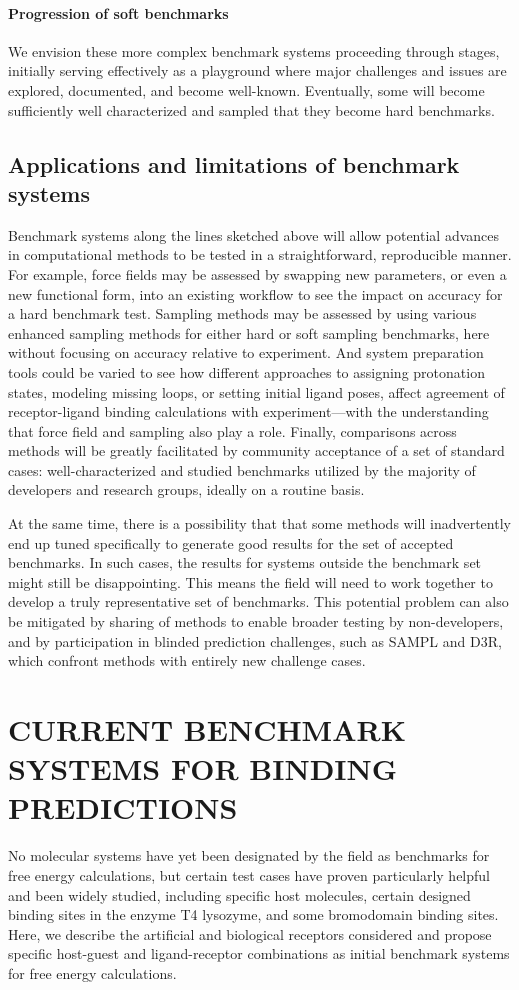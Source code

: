 \documentclass[aps,pre,twocolumn,nofootinbib,superscriptaddress,10pt, final,tightenlines]{revtex4-1}
\begin{document}
\paragraph{Progression of soft benchmarks} We envision these more complex benchmark systems proceeding through stages, initially serving effectively as a playground where major challenges and issues are explored, documented, and become well-known. 
Eventually, some will become sufficiently well characterized and sampled that they become hard benchmarks.

\subsection{Applications and limitations of benchmark systems}
Benchmark systems along the lines sketched above will allow potential advances in computational methods to be tested in a straightforward, reproducible manner. 
For example, force fields may be assessed by swapping new parameters, or even a new functional form, into an existing workflow to see the impact on accuracy for a hard benchmark test.
Sampling methods may be assessed by using various enhanced sampling methods for either hard or soft sampling benchmarks, here without focusing on accuracy relative to experiment.
And system preparation tools could be varied to see how different approaches to assigning protonation states, modeling missing loops, or setting initial ligand poses, affect agreement of receptor-ligand binding calculations with experiment---with the understanding that force field and sampling also play a role. 
Finally, comparisons across methods will be greatly facilitated by community acceptance of a set of standard cases: well-characterized and studied benchmarks utilized by the majority of developers and research groups, ideally on a routine basis.

At the same time, there is a possibility that that some methods will inadvertently end up tuned specifically to generate good results for the set of accepted benchmarks. 
In such cases, the results for systems outside the benchmark set might still be disappointing. 
This means the field will need to work together to develop a truly representative set of benchmarks.
This potential problem can also be mitigated by sharing of methods to enable broader testing by non-developers, and by participation in blinded prediction challenges, such as SAMPL and D3R, which confront methods with entirely new challenge cases. 

\section{CURRENT BENCHMARK SYSTEMS FOR BINDING PREDICTIONS}
\label{benchmarks}
No molecular systems have yet been designated by the field as benchmarks for free energy calculations, but certain test cases have proven particularly helpful and been widely studied, including specific host molecules, certain designed binding sites in the enzyme T4 lysozyme, and some bromodomain binding sites. 
Here, we describe the artificial and biological receptors considered and propose specific host-guest and ligand-receptor combinations as initial benchmark systems for free energy calculations. 
\end{document}

